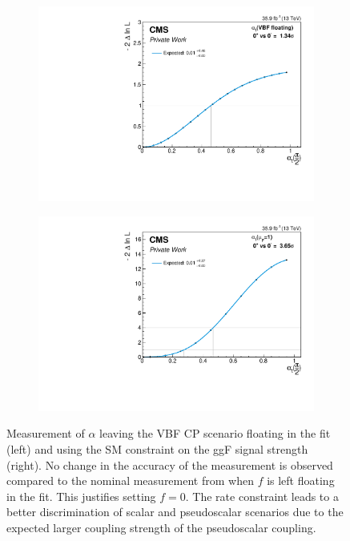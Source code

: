 \begin{figure}[h!]
    \centering
    \begin{subfigure}{.49\textwidth}
        \centering
        \includegraphics[width=\textwidth]{Figures/statana/Scan_JEC_mela3D/alpha_VBFfloating.pdf}
    \end{subfigure}
    \begin{subfigure}{.49\textwidth}
        \centering
        \includegraphics[width=\textwidth]{Figures/statana/Scan_JEC_mela3D/alpha_ggFconstraint.pdf}
    \end{subfigure}
    \caption[Measurement of $\alpha$ with floating VBF background and rate constraint.]{Measurement of $\alpha$ leaving the VBF CP scenario floating in the fit (left) and using the SM constraint on the ggF signal strength (right).
    No change in the accuracy of the measurement is observed compared to the nominal measurement from  when $f$ is left floating in the fit. This justifies setting $f=0$. 
    The rate constraint leads to a better discrimination of scalar and pseudoscalar scenarios due to the expected larger coupling strength of the pseudoscalar coupling.}\label{statana:scan_alpha_ggF_VBF}
\end{figure}

